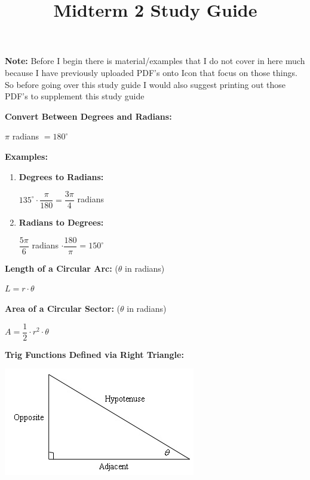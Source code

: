 \documentclass[12pt]{article}
\newenvironment{myindentpar}[1]%
     {\begin{list}{}%
             {\setlength{\leftmargin}{#1}}%
             \item[]%
     }
     {\end{list}}
\begin{document}
\title{Midterm 2 Study Guide}
\date{}
\author{}
\maketitle

\textbf{Note:} Before I begin there is material/examples that I do not cover in here much because I have previously uploaded PDF's onto Icon that focus on those things. So before going over this study guide I would also suggest printing out those PDF's to supplement this study guide

\textbf{Convert Between Degrees and Radians:}
\newline

\centerline{$ \pi$ radians $ = 180^{\circ}$}

\begin{myindentpar}{1cm}
\textbf{Examples:}
\begin{myindentpar}{2cm}
\begin{enumerate}
\item \textbf{Degrees to Radians:}

$135^{\circ} \cdot \dfrac{\pi}{180} = \dfrac{3 \pi}{4}$  radians

\item \textbf{Radians to Degrees:}

$\dfrac{5 \pi}{6}$ radians $\cdot \dfrac{180}{\pi} = 150^{\circ}$ 
\end{enumerate}
\end{myindentpar}
\end{myindentpar}

\textbf{Length of a Circular Arc:} ($\theta$ in radians)
\newline

\centerline{$L = r \cdot \theta$}

\textbf{Area of a Circular Sector:} ($\theta$ in radians)
\newline

\centerline{$A = \dfrac{1}{2} \cdot r^2 \cdot \theta$}

\newpage

\textbf{Trig Functions Defined via Right Triangle:} 
\newline

\centerline{\includegraphics{RightTriangle.jpg}}
\end{document}
